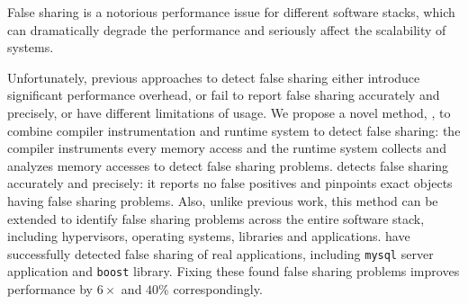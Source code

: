 
\begin{comment}
False sharing is notorious for performance degradation in multithreaded
programs. It apprears when two or more threads running on different cores periodically access 
different portions of data that can fit into one cache line. Since caching
system in a multicore processor needs to ensure a coherent view of memory
accross all cores, it has to grant an exclusive access
for each write operation by invidating duplicate copies in other cores. As a
result, frequent cache invalidation can seriously affect the scalability and
performance of multithreaded programs.
\end{comment} 

False sharing is a notorious performance issue for different software stacks, 
which can dramatically degrade the performance and seriously affect the scalability of 
systems.

Unfortunately, previous approaches to detect false sharing
either introduce significant performance overhead, or fail
to report false sharing accurately and precisely, or have different limitations of usage. 
We propose a novel method, \Predator{}, to combine compiler instrumentation
and runtime system to detect false sharing: 
the compiler instruments every memory access and 
the runtime system collects and analyzes memory accesses to detect false sharing problems.
\Predator{} detects false sharing accurately and precisely: it reports no 
false positives and pinpoints exact objects having false sharing problems.
Also, unlike previous work, this method can be extended to
identify false sharing problems across the entire software stack, including 
hypervisors, operating systems, libraries and applications. 
\Predator{} have successfully detected false sharing of real applications,
including \texttt{mysql} server application and \texttt{boost} library. Fixing these found
false sharing problems improves performance by $6\times$ and $40\%$ correspondingly.

